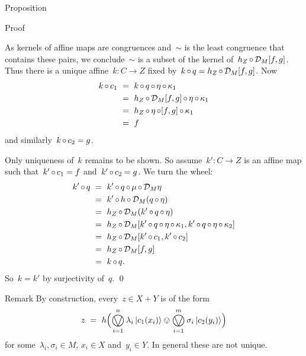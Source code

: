 \documentclass[b]{subfiles}
\begin{document}
\begin{parsec}
\begin{point}{Proposition}
\begin{point}{Proof}
\begin{point}
As kernels of affine maps are congruences
    and~$\sim$ is the least congruence that contains these pairs,
    we conclude~$\sim$ is a subset of the kernel
    of~$h_Z \mathop{\circ} \mathcal{D}_M [f,g]$.
Thus there is a unique affine~$k\colon C \to Z$
    fixed by~$k \mathop{\circ} q = h_Z \mathop{\circ} \mathcal{D}_M [f,g]$.
Now
\begin{align*}
    k \mathop{\circ} c_1 
    &\ = \ k \mathop{\circ} q \mathop{\circ} \eta \mathop{\circ} \kappa_1 \\
    &\ = \ h_Z \mathop{\circ} \mathcal{D}_M [f,g]
                            \mathop{\circ} \eta\mathop{\circ} \kappa_1 \\
    &\ = \ h_Z \mathop{\circ} \eta \mathop{\circ}  [f,g]
                            \mathop{\circ} \kappa_1 \\
    &\ = \  f
\end{align*}
and similarly~$k \mathop{\circ} c_2 = g$.
\end{point}
\begin{point}%
Only uniqueness of~$k$ remains to be shown.
So assume~$k'\colon C \to Z$ is an affine map
    such that~$k' \mathop{\circ} c_1 = f$
    and~$k' \mathop{\circ} c_2 = g$.
We turn the wheel:
\begin{align*}
    k' \mathop{\circ} q
    & \ = \ k' \mathop{\circ} q \mathop{\circ} \mu \mathop{\circ} \mathcal{D}_M \eta \\
    & \ = \ k' \mathop{\circ} h \mathop{\circ} \mathcal{D}_M (q \mathop{\circ} \eta) \\
    & \ = \ h_Z \mathop{\circ} \mathcal{D}_M (k' \mathop{\circ} q \mathop{\circ} \eta) \\
    & \ = \ h_Z \mathop{\circ} \mathcal{D}_M 
    [ k' \mathop{\circ} q \mathop{\circ} \eta \mathop{\circ} \kappa_1,
    k' \mathop{\circ} q \mathop{\circ} \eta \mathop{\circ} \kappa_2]  \\
    & \ = \ h_Z \mathop{\circ} \mathcal{D}_M 
    [ k' \mathop{\circ} c_1,
    k' \mathop{\circ} c_2]  \\
    & \ = \ h_Z \mathop{\circ} \mathcal{D}_M [ f, g] \\
    & \ = \ k \mathop{\circ} q.
\end{align*}
So~$k = k'$ by surjectivity of~$q$. \qed
\end{point}
\end{point}
\begin{point}{Remark}%
By construction,
    every~$z \in X+Y$
    is of the
    form
\begin{equation*}
    z \ =\  h 
    \Bigl( \bigovee^n_{i=1} \lambda_i \ket{c_1(x_i)}
    \ovee \bigovee^m_{i=1} \sigma_i \ket{c_2(y_i)} \Bigr)
\end{equation*}
for some~$\lambda_i,\sigma_i \in M $, 
$x_i \in X$ and~$y_i \in Y$.
In general these are not unique.

\end{point}
\end{point}
\end{parsec}
\end{document}

